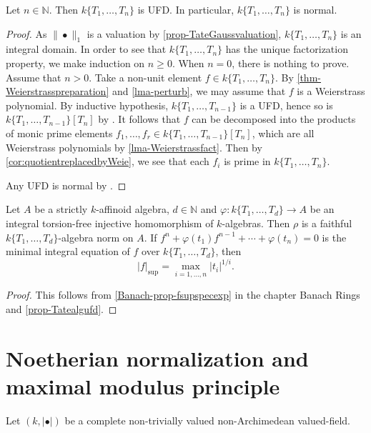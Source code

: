 \begin{proposition}\label{prop-Tatealgufd}
    Let $n\in \mathbb{N}$. Then $k\{T_1,\ldots,T_n\}$ is UFD. In particular, $k\{T_1,\ldots,T_n\}$ is normal.
\end{proposition}
\begin{proof}
    As $\|\bullet\|_1$ is a valuation by \cref{prop-TateGaussvaluation}, $k\{T_1,\ldots,T_n\}$ is an integral domain. In order to see that $k\{T_1,\ldots,T_n\}$ has the unique factorization property, we make induction on $n\geq 0$. When $n=0$, there is nothing to prove. Assume that $n>0$. Take a non-unit element $f\in k\{T_1,\ldots,T_n\}$. By \cref{thm-Weierstrasspreparation} and \cref{lma-perturb}, we may assume that $f$ is a Weierstrass polynomial. By inductive hypothesis, $k\{T_1,\ldots,T_{n-1}\}$ is a UFD, hence so is $k\{T_1,\ldots,T_{n-1}\}[T_n]$ by \cite[\href{https://stacks.math.columbia.edu/tag/0BC1}{Tag 0BC1}]{stacks-project}. It follows that $f$ can be decomposed into the products of monic prime elements $f_1,\ldots,f_r\in k\{T_1,\ldots,T_{n-1}\}[T_n]$, which are all Weierstrass polynomials by \cref{lma-Weierstrassfact}. Then by \cref{cor:quotientreplacedbyWeie}, we see that each $f_i$ is prime in $k\{T_1,\ldots,T_{n}\}$.

    Any UFD is normal by \cite[\href{https://stacks.math.columbia.edu/tag/0AFV}{Tag 0AFV}]{stacks-project}.
\end{proof}


\begin{corollary}\label{cor-rhofaithful}
    Let $A$ be a strictly $k$-affinoid algebra, $d\in \mathbb{N}$ and $\varphi:k\{T_1,\ldots,T_d\}\rightarrow A$ be an integral torsion-free injective homomorphism of $k$-algebras. Then $\rho$ is a faithful $k\{T_1,\ldots,T_d\}$-algebra norm on $A$. If $f^n+\varphi(t_1)f^{n-1}+\cdots+\varphi(t_n)=0$ is the minimal integral equation of $f$ over $k\{T_1,\ldots,T_d\}$, then 
    \[
        |f|_{\sup}=\max_{i=1,\ldots,n} |t_i|^{1/i}.  
    \]
\end{corollary}
\begin{proof}
    This follows from \cref{Banach-prop-fsupspecexp} in the chapter Banach Rings and \cref{prop-Tatealgufd}.
\end{proof}


\section{Noetherian normalization and maximal modulus principle}
Let $(k,|\bullet|)$ be a complete non-trivially valued non-Archimedean valued-field. 

